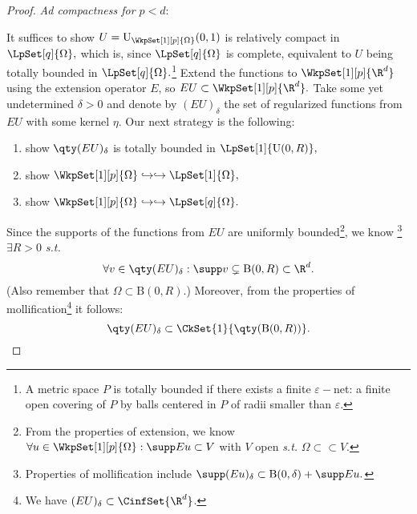 \begin{proof}
	\textit{Ad compactness for $p<d$}:

	It suffices to show $U = \text{U}_{\WkpSet[1][p]{\Omega}}(0,1)$ is relatively compact in $\LpSet[q]{\Omega},$ which is, since $\LpSet[q]{\Omega}$ is complete, equivalent to $U$ being totally bounded in $\LpSet[q]{\Omega}.$\footnote{A metric space $P$ is totally bounded if there exists a finite $\varepsilon-$net: a finite open covering of $P$ by balls centered in $P$ of radii smaller than $\varepsilon$.} Extend the functions to $\WkpSet[1][p]{\R^{d}}$ using the extension operator $E$, so $EU \subset \WkpSet[1][p]{\R^{d}}.$ Take some yet undetermined $\delta>0$ and denote by $(EU)_{\delta}$ the set of regularized functions from $EU$ with some kernel $\eta$. Our next strategy is the following:

	\begin{enumerate}
		\item show $\qty(EU)_{\delta}$ is totally bounded in $\LpSet[1]{\text{U}(0,R)},$
		\item show $\WkpSet[1][p]{\Omega} \hookrightarrow \hookrightarrow \LpSet[1]{\Omega},$
		\item show $\WkpSet[1][p]{\Omega} \hookrightarrow \hookrightarrow \LpSet[q]{\Omega}.$
	\end{enumerate}

	Since the supports of the functions from $EU$ are uniformly bounded\footnote{From the properties of extension, we know $ \forall u \in \WkpSet[1][p]{\Omega}:\supp Eu \subset V$ with $V$ open \textit{s.t.} $\Omega \subset \subset V.$}, we know \footnote{Properties of mollification include $\supp (Eu)_{\delta} \subset \text{B}(0,\delta) + \supp Eu.$} $\exists R>0$ \textit{s.t.}
	\[
		\forall v \in \qty(EU)_{\delta}: \supp v \subsetneq \text{B}(0,R) \subset \R^d.
	\]
	(Also remember that $\Omega \subset \text{B}(0,R).$)
	Moreover, from the properties of mollification\footnote{We have $(EU)_{\delta} \subset \CinfSet{\R^{d}}$.} it follows: 
	\[
		\qty(EU)_{\delta} \subset \CkSet{1}{\qty(\text{B}(0,R))}.
	\]


\end{proof}
